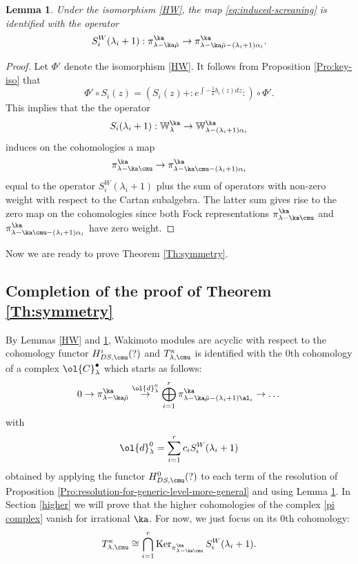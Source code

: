 \documentclass{amsart}
\newcommand{\Wak}[2]{\mathbb{W}_{#1}^{#2}}
\newcommand{\bra}{{\langle}}
\newcommand{\ket}{{\rangle}}
\newcommand{\on}{\operatorname}
\newcommand{\+}{\mathop{\oplus}}
\renewcommand{\*}{{\otimes}}
\newcommand{\mf}{\mathfrak}
\newcommand{\isomap}{{\;\stackrel{_\sim}{\to}\;}}
\newcommand{\C}{\mathbb{C}}
\newcommand{\ra}{\rightarrow}
\newcommand{\lam}{\lambda}
\theoremstyle{theorem}
\newtheorem{Lem}[Th]{Lemma}
\theoremstyle{remark}
\numberwithin{equation}{section}
\begin{document}
\begin{Lem}\label{Lem:screning-for-W}
Under the isomorphism \eqref{HW}, the map
  \eqref{eq:induced-screaning} is identified with the operator
$$
S^W_i(\lam_i+1): \pi^\ka_{\lam-\ka\check{\mu}} \to
\pi^\ka_{\lam-\ka\check{\mu}-(\lam_i+1)\alpha_i}.
$$
\end{Lem}
\begin{proof}
Let $\Phi'$ denote the isomorphism \eqref{HW}.
It follows from Proposition \ref{Pro:key-iso} that
$$\Phi'\circ  S_i(z)=(S_i(z) + :\!e^{\int
  -\frac{1}{\kappa}b_i(z)dz}\! :)\circ \Phi'.$$ This implies that the
the operator
$$
S_i(\lam_i+1): \Wak{\lam}{\ka} \to \Wak{\lam-(\lam_i+1)\alpha_i}{\ka}
$$
induces on the cohomologies a map
$$
\pi^\ka_{\lam-\ka\cmu} \to \pi^\ka_{\lam-\ka\cmu-(\lam_i+1)\alpha_i}
$$
equal to the operator
$S^W_i(\lam_i+1)$ plus the sum of operators with non-zero
weight with respect to the Cartan subalgebra. The latter sum gives
rise to the zero map on the cohomologies since both Fock
representations $\pi^\ka_{\lam-\ka\cmu}$ and
$\pi^\ka_{\lam-\ka\cmu-(\lam_i+1)\alpha_i}$ have zero weight.
\end{proof}

Now we are ready to prove Theorem \ref{Th:symmetry}.

\subsection{Completion of the proof of Theorem \ref{Th:symmetry}}

By Lemmas \ref{HW} and \ref{Lem:screning-for-W},
Wakimoto modules are acyclic with respect to the cohomology functor
$H^i_{DS,\cmu}(?)$ and $T^\kappa_{\lam,\cmu}$ is identified
with the 0th cohomology of a complex $\ol{C}^\bullet_\lam$ which
starts as follows:
\begin{equation}    \label{pi complex}
0 \ra \pi^\ka_{\lam-\ka\check{\mu}} \overset{\ol{d}^0_\lam}{\ra} \bigoplus_{i=1}^r
\pi^\ka_{\lam-\ka\check{\mu}-(\lam_i+1)\al_i} \ra \dots
\end{equation}
with
\begin{equation}    \label{bard0}
\ol{d}^0_\lam=\sum_{i=1}^{r} c_i S^W_i(\lam_i+1)
\end{equation}
obtained by applying the functor $H^0_{DS,\cmu}(?)$ to each term of
the resolution of Proposition
\ref{Pro:resolution-for-generic-level-more-general} and using Lemma
\ref{Lem:screning-for-W}. In Section \ref{higher} we will prove that
the higher cohomologies of the complex \eqref{pi complex} vanish for
irrational $\ka$. For now, we just focus on its 0th cohomology:
\begin{equation}    \label{Tlm}
T^\kappa_{\lam,\cmu}\cong \bigcap_{i=1}^r \on{Ker}_{\pi^\ka_{\lam-\ka\cmu}}
S^W_i(\lam_i+1).
\end{equation}
\end{document}
